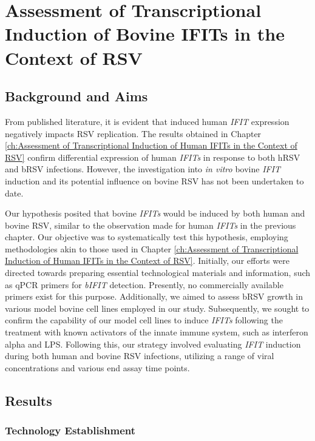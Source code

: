 \chapter{Assessment of Transcriptional Induction of Bovine IFITs in the Context of RSV} \label{ch:Assessment of Transcriptional Induction of Bovine IFITs in the Context of RSV}
\section{Background and Aims} \label{sec:Background and Aims Chapter2}
From published literature, it is evident that induced human \textit{IFIT} expression negatively impacts RSV replication. The results obtained in Chapter \ref{ch:Assessment of Transcriptional Induction of Human IFITs in the Context of RSV} confirm differential expression of human \textit{IFITs} in response to both hRSV and bRSV infections. However, the investigation into \textit{in vitro} bovine \textit{IFIT} induction and its potential influence on bovine RSV has not been undertaken to date.

Our hypothesis posited that bovine \textit{IFITs} would be induced by both human and bovine RSV, similar to the observation made for human \textit{IFITs} in the previous chapter. Our objective was to systematically test this hypothesis, employing methodologies akin to those used in Chapter \ref{ch:Assessment of Transcriptional Induction of Human IFITs in the Context of RSV}. Initially, our efforts were directed towards preparing essential technological materials and information, such as qPCR primers for \textit{bIFIT} detection. Presently, no commercially available primers exist for this purpose. Additionally, we aimed to assess bRSV growth in various model bovine cell lines employed in our study. Subsequently, we sought to confirm the capability of our model cell lines to induce \textit{IFITs} following the treatment with known activators of the innate immune system, such as interferon alpha and LPS. Following this, our strategy involved evaluating \textit{IFIT} induction during both human and bovine RSV infections, utilizing a range of viral concentrations and various end assay time points.

\section{Results} \label{sec:Results Chapter2}
\subsection{Technology Establishment} \label{subsec:Technology Establishment}
